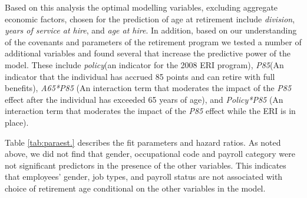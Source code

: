 \documentclass[12pt,letterpaper]{article}
\begin{document}


Based on this analysis the optimal modelling variables, excluding aggregate economic factors, chosen for the prediction of age at retirement include {\it division}, {\it years of service at hire}, and {\it age at hire}.  In addition, based on our understanding of the covenants and parameters of the retirement program we tested a number of additional variables and found several that increase the predictive power of the model. These include {\it policy}(an indicator for the 2008 ERI program), {\it P85}(An indicator that the individual has accrued 85 points and can retire with full benefits), {\it A65*P85} (An interaction term that moderates the impact of the {\it P85} effect after the individual has exceeded 65 years of age), and  {\it Policy*P85} (An interaction term that moderates the impact of the {\it P85} effect while the ERI is in place).

Table \ref{tab:paraest.} describes the fit parameters and hazard ratios.  As noted above, we did not find that gender, occupational code and payroll category were not significant predictors in the presence of the other variables. This indicates that employees' gender, job types, and payroll status are not associated with choice of retirement age conditional on the other variables in the model.
\end{document}
